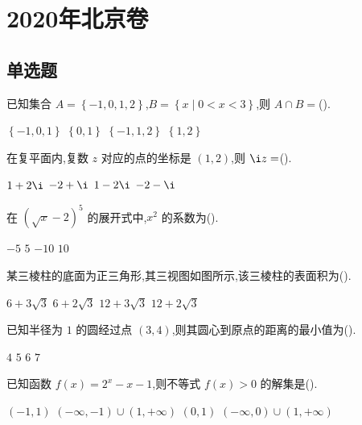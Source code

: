 \chapter{2020年北京卷}

\section{单选题}

\begin{problem}
已知集合 \(A=\left\{ -1,0,1,2 \right\}\),\(B=\left\{ x\mid 0<x<3 \right\}\),则 \(A\cap B=\)(\quad).

\choices
    {\(\left\{ -1,0,1 \right\}\)}
    {\(\left\{ 0,1 \right\}\)}
    {\(\left\{ -1,1,2 \right\}\)}
    {\(\left\{ 1,2 \right\}\)}
\end{problem}

\begin{problem}
在复平面内,复数 \(z\) 对应的点的坐标是 \((1,2)\),则 \(\i z=\)(\quad).

\choices
    {\(1+2\i\)}
    {\(-2+\i\)}
    {\(1-2\i\)}
    {\(-2-\i\)}
\end{problem}

\begin{problem}
在 \(\left(\sqrt{x}-2\right)^5\) 的展开式中,\(x^2\) 的系数为(\quad).

\choices
    {\(-5\)}
    {\(5\)}
    {\(-10\)}
    {\(10\)}
\end{problem}

\begin{problem}
某三棱柱的底面为正三角形,其三视图如图所示,该三棱柱的表面积为(\quad).

\begin{center}
\end{center}

\choices
    {\(6+3\sqrt3\)}
    {\(6+2\sqrt3\)}
    {\(12+3\sqrt3\)}
    {\(12+2\sqrt3\)}
\end{problem}

\begin{problem}
已知半径为 \(1\) 的圆经过点 \((3,4)\),则其圆心到原点的距离的最小值为(\quad).

\choices
    {\(4\)}
    {\(5\)}
    {\(6\)}
    {\(7\)}
\end{problem}

\begin{problem}
已知函数 \(f(x)=2^x-x-1\),则不等式 \(f(x)>0\) 的解集是(\quad).

\choices
    {\((-1,1)\)}
    {\((-\infty,-1)\cup(1,+\infty)\)}
    {\((0,1)\)}
    {\((-\infty,0)\cup(1,+\infty)\)}
\end{problem}

